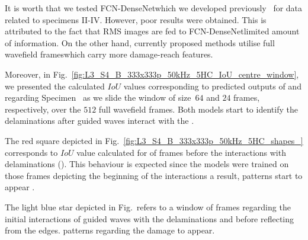 It is worth \DIFdelbegin {}\DIFdelend \DIFaddbegin {}\DIFaddend that we tested FCN-DenseNet\DIFaddbegin \DIFadd{, }\DIFaddend which we developed previously~\cite{Ijjeh2021} for data related to specimens II-IV. 
However, poor results were obtained. 
This is attributed to the fact that RMS images are fed to FCN-DenseNet\DIFdelbegin {}\DIFdelend \DIFaddbegin {}\DIFaddend limited amount of \DIFdelbegin {}\DIFdelend \DIFaddbegin {}\DIFaddend information. 
On the other hand, currently proposed methods utilise full wavefield frames\DIFaddbegin \DIFadd{, }\DIFaddend which carry more damage-reach features. 

Moreover, in Fig.~\ref{fig:L3_S4_B_333x333p_50kHz_5HC_IoU_centre_window}, we presented the calculated \(IoU\) values corresponding to predicted outputs of \DIFdelbegin {}\DIFdelend \DIFaddbegin {}\DIFaddend {} and \DIFaddbegin {}\DIFaddend {} regarding Specimen~ as we slide the window of size~\(64\) and \(24\) frames, respectively, over the \(512\) full wavefield frames.
Both models start to identify the delaminations after \DIFdelbegin {}\DIFdelend \DIFaddbegin {}\DIFaddend guided waves interact with the \DIFdelbegin {}\DIFdelend \DIFaddbegin {}\DIFaddend .

The red square depicted in Fig.~\ref{fig:L3_S4_B_333x333p_50kHz_5HC_shapes_} corresponds to \(IoU\) value calculated for \DIFdelbegin {}\DIFdelend \DIFaddbegin {}\DIFaddend of frames before the interactions with delaminations (\DIFdelbegin {}\DIFdelend \DIFaddbegin {}\DIFaddend ).
This behaviour is expected since the models were trained on those frames depicting the beginning of the interactions \DIFdelbegin {}\DIFdelend \DIFaddbegin {}\DIFaddend a result, \DIFdelbegin {}\DIFdelend \DIFaddbegin {}\DIFaddend patterns start to appear \DIFaddbegin {}\DIFaddend .

The light blue star depicted in Fig.~\DIFdelbegin \DIFdel{\ref{fig:L3_S4_B_333x333p_50kHz_5HC_shapes_} }\DIFdelend \DIFaddbegin \DIFadd{\ref{fig:L3_S4_B_333x333p_50kHz_5HC_IoU_centre_window} }\DIFaddend refers to a window of frames regarding the initial interactions of \DIFdelbegin {}\DIFdelend \DIFaddbegin {}\DIFaddend guided waves with the delaminations and before reflecting from the edges.
\DIFdelbegin {}\DIFdelend \DIFaddbegin {}\DIFaddend patterns regarding the damage \DIFdelbegin {}\DIFdelend \DIFaddbegin {}\DIFaddend to appear.

